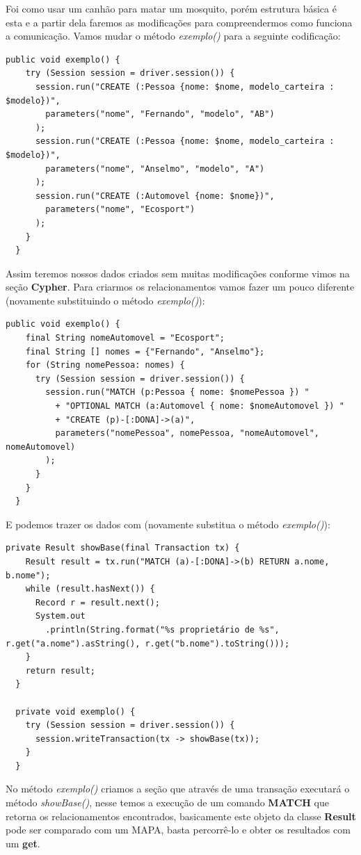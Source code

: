 Foi como usar um canhão para matar um mosquito, porém estrutura básica é esta e a partir dela faremos as modificações para compreendermos como funciona a comunicação. Vamos mudar o método \textit{exemplo()} para a seguinte codificação:
\begin{lstlisting}[]
  public void exemplo() {
    try (Session session = driver.session()) {
      session.run("CREATE (:Pessoa {nome: $nome, modelo_carteira : $modelo})", 
        parameters("nome", "Fernando", "modelo", "AB") 
      );
      session.run("CREATE (:Pessoa {nome: $nome, modelo_carteira : $modelo})", 
        parameters("nome", "Anselmo", "modelo", "A") 
      );
      session.run("CREATE (:Automovel {nome: $nome})", 
        parameters("nome", "Ecosport") 
      );
    }
  }
\end{lstlisting}

Assim teremos nossos dados criados sem muitas modificações conforme vimos na seção \textbf{Cypher}. Para criarmos os relacionamentos vamos fazer um pouco diferente (novamente substituindo o método \textit{exemplo()}):

\begin{lstlisting}[]
  public void exemplo() {
    final String nomeAutomovel = "Ecosport";
    final String [] nomes = {"Fernando", "Anselmo"};
    for (String nomePessoa: nomes) {
      try (Session session = driver.session()) {
        session.run("MATCH (p:Pessoa { nome: $nomePessoa }) "
          + "OPTIONAL MATCH (a:Automovel { nome: $nomeAutomovel }) "
          + "CREATE (p)-[:DONA]->(a)", 
          parameters("nomePessoa", nomePessoa, "nomeAutomovel", nomeAutomovel) 
        );
      }
    }
  }
\end{lstlisting}

E podemos trazer os dados com (novamente substitua o método \textit{exemplo()}):

\begin{lstlisting}[]
  private Result showBase(final Transaction tx) {
    Result result = tx.run("MATCH (a)-[:DONA]->(b) RETURN a.nome, b.nome");
    while (result.hasNext()) {
      Record r = result.next();
      System.out
        .println(String.format("%s proprietário de %s", r.get("a.nome").asString(), r.get("b.nome").toString()));
    }
    return result;
  }

  private void exemplo() {
    try (Session session = driver.session()) {
      session.writeTransaction(tx -> showBase(tx));
    }
  }
\end{lstlisting}

No método \textit{exemplo()} criamos a seção que através de uma transação executará o método \textit{showBase()}, nesse temos a execução de um comando \textbf{MATCH} que retorna os relacionamentos encontrados, basicamente este objeto da classe \textbf{Result} pode ser comparado com um MAPA, basta percorrê-lo e obter os resultados com um \textbf{get}.

